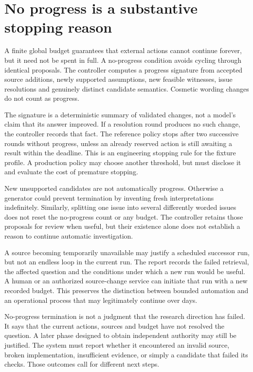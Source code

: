 \section{No progress is a substantive stopping reason}
\label{merge:M06:13}


A finite global budget guarantees that external actions cannot continue forever,
but it need not be spent in full. A no-progress condition avoids cycling through
identical proposals. The controller computes a progress signature from accepted
source additions, newly supported assumptions, new feasible witnesses, issue
resolutions and genuinely distinct candidate semantics. Cosmetic wording changes
do not count as progress.

The signature is a deterministic summary of validated changes, not a model's
claim that its answer improved. If a resolution round produces no such change,
the controller records that fact. The reference policy stops after two successive
rounds without progress, unless an already reserved action is still awaiting a
result within the deadline. This is an engineering stopping rule for the fixture
profile. A production policy may choose another threshold, but must disclose it
and evaluate the cost of premature stopping.


New unsupported candidates are not automatically progress. Otherwise a generator
could prevent termination by inventing fresh interpretations indefinitely.
Similarly, splitting one issue into several differently worded issues does not
reset the no-progress count or any budget. The controller retains those proposals
for review when useful, but their existence alone does not establish a reason to
continue automatic investigation.

A source becoming temporarily unavailable may justify a scheduled successor run,
but not an endless loop in the current run. The report records the failed
retrieval, the affected question and the conditions under which a new run would
be useful. A human or an authorized source-change service can initiate that run
with a new recorded budget. This preserves the distinction between bounded
automation and an operational process that may legitimately continue over days.

No-progress termination is not a judgment that the research direction has failed.
It says that the current actions, sources and budget have not resolved the
question. A later phase designed to obtain independent authority may still be
justified. The system must report whether it encountered an invalid source,
broken implementation, insufficient evidence, or simply a candidate that failed
its checks. Those outcomes call for different next steps.

